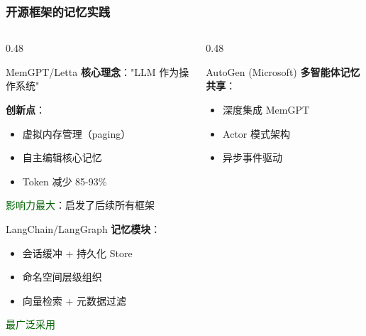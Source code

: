 \documentclass[aspectratio=169,10pt]{beamer}
\begin{document}
\begin{frame}
  \frametitle{开源框架的记忆实践}

  \begin{columns}[T]
    \begin{column}{0.48\textwidth}
      \begin{block}{MemGPT/Letta}
        \footnotesize
        \textbf{核心理念}："LLM 作为操作系统"

        \vspace{0.2cm}

        \textbf{创新点}：
        \begin{itemize}
          \item 虚拟内存管理（paging）
          \item 自主编辑核心记忆
          \item Token 减少 85-93\%
        \end{itemize}

        \vspace{0.2cm}

        \textcolor{darkgreen}{影响力最大}：启发了后续所有框架
      \end{block}

      \vspace{0.2cm}

      \begin{block}{LangChain/LangGraph}
        \footnotesize
        \textbf{记忆模块}：
        \begin{itemize}
          \item 会话缓冲 + 持久化 Store
          \item 命名空间层级组织
          \item 向量检索 + 元数据过滤
        \end{itemize}

        \textcolor{darkgreen}{最广泛采用}
      \end{block}
    \end{column}

    \begin{column}{0.48\textwidth}
      \begin{block}{AutoGen (Microsoft)}
        \footnotesize
        \textbf{多智能体记忆共享}：
        \begin{itemize}
          \item 深度集成 MemGPT
          \item Actor 模式架构
          \item 异步事件驱动
        \end{itemize}


\end{block}
\end{column}
\end{columns}
\end{frame}
\end{document}
